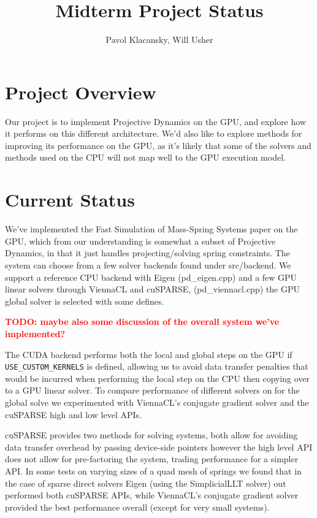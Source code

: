 \documentclass[11pt]{article}
\newcommand{\TODO}[1]{\textcolor{red}{\textbf{TODO: #1}}}
\begin{document}
\title{Midterm Project Status}
\author{Pavol Klacansky, Will Usher}
\maketitle

\section{Project Overview}

Our project is to implement Projective Dynamics on the GPU, and explore how it performs
on this different architecture. We'd also like to explore methods for improving its performance
on the GPU, as it's likely that some of the solvers and methods used on the CPU will not map
well to the GPU execution model.

\section{Current Status}

We've implemented the Fast Simulation of Mass-Spring Systems paper on the GPU, which
from our understanding is somewhat a subset of Projective Dynamics, in that it just handles
projecting/solving spring constraints. The system can choose from a few solver backends found under
src/backend. We support a reference CPU backend with Eigen (pd\_eigen.cpp) and a few GPU
linear solvers through ViennaCL and cuSPARSE, (pd\_viennacl.cpp) the GPU global solver is selected
with some defines.

\TODO{maybe also some discussion of the overall system we've implemented?}

The CUDA backend performs both the local and global steps on the GPU if \texttt{USE\_CUSTOM\_KERNELS} is
defined, allowing us to avoid data transfer penalties that would be incurred when performing the
local step on the CPU then copying over to a GPU linear solver. To compare performance of different solvers
on for the global solve we experimented with ViennaCL's conjugate gradient solver and the cuSPARSE high
and low level APIs.

cuSPARSE provides two methods for solving systems, both allow for avoiding data transfer overhead
by passing device-side pointers however the high level API does not allow for pre-factoring the system,
trading performance for a simpler API. In some tests on varying sizes of a quad mesh of springs we
found that in the case of sparse direct solvers Eigen (using the SimplicialLLT solver) out performed
both cuSPARSE APIs, while ViennaCL's conjugate gradient solver provided the best performance overall
(except for very small systems).
\end{document}
